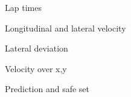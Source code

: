 
\begin{figure}[ht]
    \centering
      
    \caption{Lap times}
    \label{fig:exp_lapTime}
\end{figure}

\begin{figure}[ht]
    \centering
      
    \caption{Longitudinal and lateral velocity}
    \label{fig:exp_v}
\end{figure}

\begin{figure}[ht]
    \centering
      
    \caption{Lateral deviation}
    \label{fig:exp_e_Y}
\end{figure}

\begin{figure}[ht]
    \centering
      
    \caption{Velocity over x,y}
    \label{fig:exp_v_over_xy}
\end{figure}

\begin{figure}[ht]
    \centering
      
    \caption{Prediction and safe set}
    \label{fig:xy_safeset}
\end{figure}
